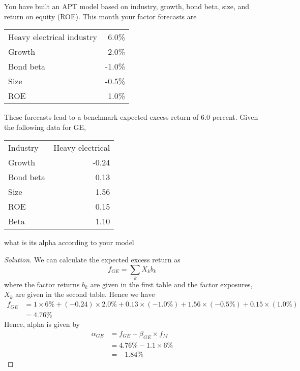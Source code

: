 \begin{problem}{7.5}
  You have built an APT model based on industry, growth, bond beta, size, and return on equity (ROE). This month your factor forecasts are
  \begin{center}
   \begin{tabular}{l r}
    Heavy electrical industry 	& 6.0\% \\
    Growth			& 2.0\% \\
    Bond beta			& -1.0\% \\
    Size 			& -0.5\% \\
    ROE				&  1.0\% 
   \end{tabular}
  \end{center}
  These forecasts lead to a benchmark expected excess return of 6.0 percent. Given the following data for GE,
  \begin{center}
   \begin{tabular}{l r}
    Industry			& Heavy electrical \\
    Growth			& -0.24 \\
    Bond beta			&  0.13 \\
    Size 			&  1.56 \\
    ROE				&  0.15 \\
    Beta			&  1.10
   \end{tabular}
  \end{center}
  what is its alpha according to your model
\end{problem}

\begin{proof}[Solution]
  We can calculate the expected excess return as
  \begin{equation*}
   f_{GE} = \sum_{k}X_{k}b_{k}
  \end{equation*}
  where the factor returns $b_{k}$ are given in the first table and the factor exposures, $X_{k}$ are given in the second table. Hence we have
  \begin{align*}
   f_{GE} &= 1\times 6\% +(-0.24)\times2.0\% + 0.13\times(-1.0\%) +1.56\times(-0.5\%) + 0.15\times(1.0\%)\\
	  &=4.76\%
  \end{align*}
  Hence, alpha is given by
  \begin{align*}
   \alpha_{GE}&=f_{GE} -\beta_{GE}\times f_{M}\\
	      &=4.76\% - 1.1\times6\%\\
	      &=-1.84\%
  \end{align*}


\end{proof}
